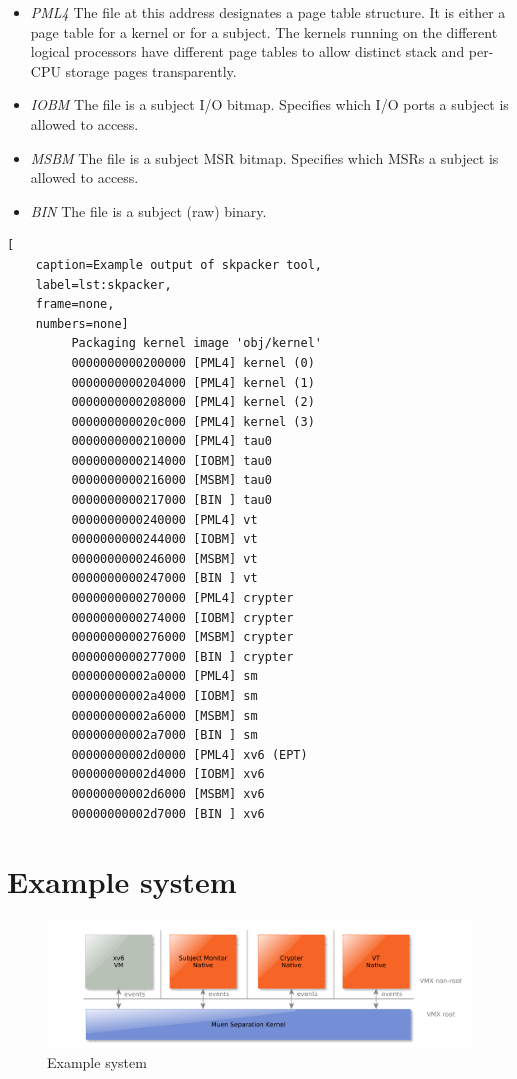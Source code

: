 \begin{itemize}
	\item \emph{PML4} The file at this address designates a page table
		structure. It is either a page table for a kernel or for a subject. The
		kernels running on the different logical processors have different page
		tables to allow distinct stack and per-CPU storage pages transparently.
	\item \emph{IOBM} The file is a subject I/O bitmap. Specifies which I/O
		ports a subject is allowed to access.
	\item \emph{MSBM} The file is a subject MSR bitmap. Specifies which MSRs a
		subject is allowed to access.
	\item \emph{BIN} The file is a subject (raw) binary.
\end{itemize}

\begin{lstlisting}[
	caption=Example output of skpacker tool,
	label=lst:skpacker,
	frame=none,
	numbers=none]
         Packaging kernel image 'obj/kernel'
         0000000000200000 [PML4] kernel (0)
         0000000000204000 [PML4] kernel (1)
         0000000000208000 [PML4] kernel (2)
         000000000020c000 [PML4] kernel (3)
         0000000000210000 [PML4] tau0
         0000000000214000 [IOBM] tau0
         0000000000216000 [MSBM] tau0
         0000000000217000 [BIN ] tau0
         0000000000240000 [PML4] vt
         0000000000244000 [IOBM] vt
         0000000000246000 [MSBM] vt
         0000000000247000 [BIN ] vt
         0000000000270000 [PML4] crypter
         0000000000274000 [IOBM] crypter
         0000000000276000 [MSBM] crypter
         0000000000277000 [BIN ] crypter
         00000000002a0000 [PML4] sm
         00000000002a4000 [IOBM] sm
         00000000002a6000 [MSBM] sm
         00000000002a7000 [BIN ] sm
         00000000002d0000 [PML4] xv6 (EPT)
         00000000002d4000 [IOBM] xv6
         00000000002d6000 [MSBM] xv6
         00000000002d7000 [BIN ] xv6
\end{lstlisting}

\section{Example system}\label{sec:example-system}
\begin{figure}[h]
	\centering
	\includegraphics[width=\textwidth]{images/architecture-example_system}
	\caption{Example system}
	\label{fig:example-system}
\end{figure}
